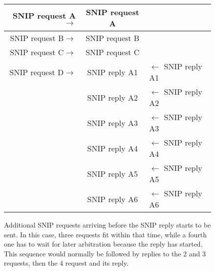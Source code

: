 \documentclass[11pt]{article}
\begin{document}
\begin{figure}[!htbp]
\begin{center}
\begin{tabular}{ r | c | l}
\hline
SNIP request A$\rightarrow$ & SNIP request A & \\ \hline
SNIP request B$\rightarrow$ & SNIP request B & \\ \hline
SNIP request C$\rightarrow$ & SNIP request C & \\ \hline
SNIP request D$\rightarrow$ & SNIP reply A1  & $\leftarrow$ SNIP reply A1 \\ \hline
    & SNIP reply A2  & $\leftarrow$ SNIP reply A2 \\ \hline
    & SNIP reply A3  & $\leftarrow$ SNIP reply A3 \\ \hline
    & SNIP reply A4  & $\leftarrow$ SNIP reply A4 \\ \hline
    & SNIP reply A5  & $\leftarrow$ SNIP reply A5 \\ \hline
    & SNIP reply A6  & $\leftarrow$ SNIP reply A6 \\ \hline
\end{tabular}
\end{center}
\caption{Additional SNIP requests arriving before the SNIP reply
starts to be sent. In this case, three requests fit within that time, while 
a fourth one has to wait for later arbitration because the reply has 
started. This sequence would normally be followed by replies
to the 2 and 3 requests, then the 4 request and its reply.}
\label{fig:fast_double_SNIP_interaction}
\end{figure}
\end{document}
